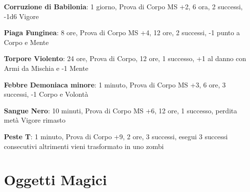 \documentclass[12pt,a4paper,twoside,openany]{book}
\begin{document}
\begin{multicols}{2}
\textbf{Corruzione di Babilonia}: 1 giorno, Prova di Corpo MS +2, 6 ora, 2 successi, -1d6 Vigore

\textbf{Piaga Funginea}: 8 ore, Prova di Corpo MS +4, 12 ore, 2 successi, -1 punto a Corpo e Mente

\textbf{Torpore Violento}: 24 ore, Prova di Corpo, 12 ore, 1 successo, +1 al danno con Armi da Mischia e -1 Mente

\textbf{Febbre Demoniaca minore}: 1 minuto, Prova di Corpo MS +3, 6 ore, 3 successi, -1 Corpo e Volontà

\textbf{Sangue Nero}: 10 minuti, Prova di Corpo MS +6, 12 ore, 1 successo, perdita metà Vigore rimasto

\textbf{Peste T}: 1 minuto, Prova di Corpo +9, 2 ore, 3 successi, esegui 3 successi consecutivi altrimenti vieni trasformato in uno zombi

\end{multicols}

\pagebreak

\section{Oggetti Magici}
\end{document}
